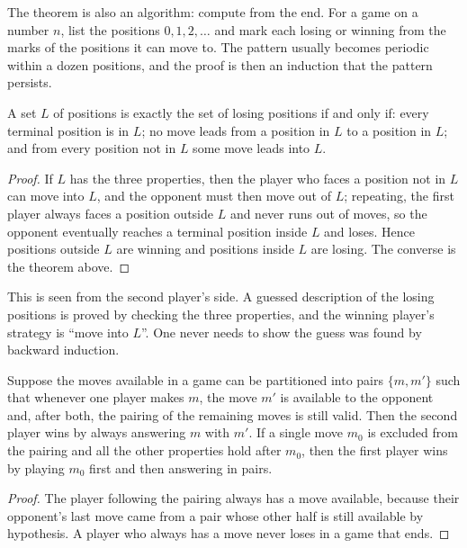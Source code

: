 The theorem is also an algorithm: compute from the end. For a game on a number $n$, list the positions $0, 1, 2, \dots$ and mark each losing or winning from the marks of the positions it can move to. The pattern usually becomes periodic within a dozen positions, and the proof is then an induction that the pattern persists.

\begin{proposition}
A set $L$ of positions is exactly the set of losing positions if and only if: every terminal position is in $L$; no move leads from a position in $L$ to a position in $L$; and from every position not in $L$ some move leads into $L$.
\end{proposition}

\begin{proof}
If $L$ has the three properties, then the player who faces a position not in $L$ can move into $L$, and the opponent must then move out of $L$; repeating, the first player always faces a position outside $L$ and never runs out of moves, so the opponent eventually reaches a terminal position inside $L$ and loses. Hence positions outside $L$ are winning and positions inside $L$ are losing. The converse is the theorem above.
\end{proof}

This is  seen from the second player's side. A guessed description of the losing positions is proved by checking the three properties, and the winning player's strategy is ``move into $L$''. One never needs to show the guess was found by backward induction.

\begin{theorem}
Suppose the moves available in a game can be partitioned into pairs $\{m, m'\}$ such that whenever one player makes $m$, the move $m'$ is available to the opponent and, after both, the pairing of the remaining moves is still valid. Then the second player wins by always answering $m$ with $m'$. If a single move $m_0$ is excluded from the pairing and all the other properties hold after $m_0$, then the first player wins by playing $m_0$ first and then answering in pairs.
\end{theorem}

\begin{proof}
The player following the pairing always has a move available, because their opponent's last move came from a pair whose other half is still available by hypothesis. A player who always has a move never loses in a game that ends.
\end{proof}

